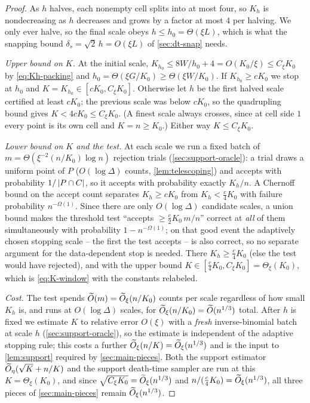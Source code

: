 \begin{proof}
As $h$ halves, each nonempty cell splits into at most four, so $K_h$ is nondecreasing as $h$ decreases and
grows by a factor at most $4$ per halving. We only ever halve, so the final scale obeys $h\le
h_0=\Theta(\xi L)$, which is what the snapping bound $\delta_s=\sqrt2\,h=O(\xi L)$ of \cref{sec:dt-snap}
needs.

\emph{Upper bound on $K$.} At the initial scale, $K_{h_0}\le 8W/h_0+4=O(K_0/\xi)\le C_\xi K_0$ by
\eqref{eq:Kh-packing} and $h_0=\Theta(\xi G/K_0)\ge\Theta(\xi W/K_0)$. If $K_{h_0}\ge cK_0$ we stop at
$h_0$ and $K=K_{h_0}\in[cK_0,C_\xi K_0]$. Otherwise let $h$ be the first halved scale certified at least
$cK_0$; the previous scale was below $cK_0$, so the quadrupling bound gives $K<4cK_0\le C_\xi K_0$. (A
finest scale always crosses, since at cell side $1$ every point is its own cell and $K=n\ge K_0$.) Either
way $K\le C_\xi K_0$.

\emph{Lower bound on $K$ and the test.} At each scale we run a fixed batch of $m=\Theta(\xi^{-2}(n/K_0)\log
n)$ rejection trials (\cref{sec:support-oracle}): a trial draws a uniform point of $P$ ($O(\log\Delta)$
counts, \cref{lem:telescoping}) and accepts with probability $1/\left|P\cap C\right|$, so it accepts with
probability exactly $K_h/n$. A Chernoff bound on the accept count separates $K_h\ge cK_0$ from
$K_h<\tfrac{c}{4}K_0$ with failure probability $n^{-\Omega(1)}$. Since there are only $O(\log\Delta)$
candidate scales, a union bound makes the threshold test ``accepts $\ge\tfrac{c}{2}K_0\,m/n$'' correct at
\emph{all} of them simultaneously with probability $1-n^{-\Omega(1)}$; on that good event the adaptively
chosen stopping scale -- the first the test accepts -- is also correct, so no separate argument for the
data-dependent stop is needed. There $K_h\ge\tfrac{c}{4}K_0$ (else the test would have rejected), and with
the upper bound $K\in[\tfrac{c}{4}K_0,C_\xi K_0]=\Theta_\xi(K_0)$, which is \eqref{eq:K-window} with the
constants relabeled.

\emph{Cost.} The test spends $\widetilde{O}(m)=\widetilde{O}_\xi(n/K_0)$ counts per scale regardless of how small $K_h$
is, and runs at $O(\log\Delta)$ scales, for $\widetilde{O}_\xi(n/K_0)=\widetilde{O}(n^{1/3})$ total. After $h$ is fixed we
estimate $K$ to relative error $O(\xi)$ with a \emph{fresh} inverse-binomial batch at scale $h$
(\cref{sec:support-oracle}), so the estimate is independent of the adaptive stopping rule; this costs a
further $\widetilde{O}_\xi(n/K)=\widetilde{O}_\xi(n^{1/3})$ and is the input to \cref{lem:support} required by
\cref{sec:main-pieces}. Both the support estimator
$\widetilde{O}_\eta(\sqrt K+n/K)$ and the support death-time sampler are run at this $K=\Theta_\xi(K_0)$, and
since $\sqrt{C_\xi K_0}=\widetilde{O}_\xi(n^{1/3})$ and $n/(\tfrac{c}{4}K_0)=\widetilde{O}_\xi(n^{1/3})$, all three pieces
of \cref{sec:main-pieces} remain $\widetilde{O}_\xi(n^{1/3})$.
\end{proof}

